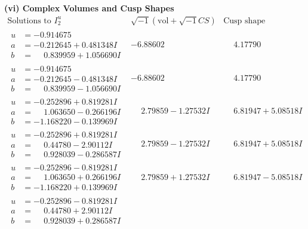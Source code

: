 \documentclass[1p]{elsarticle_modified}
\theoremstyle{definition}
\newcommand{\I}{\sqrt{-1}}
\begin{document}
\newpage\flushleft \textbf{(vi) Complex Volumes and Cusp Shapes}
$$\begin{array}{c|c|c}  
\text{Solutions to }I^u_{2}& \I (\text{vol} + \sqrt{-1}CS) & \text{Cusp shape}\\
 \hline 
\begin{aligned}
u &= -0.914675\phantom{ +0.000000I} \\
a &= -0.212645 + 0.481348 I \\
b &= \phantom{-}0.839959 + 1.056690 I\end{aligned}
 & -6.88602\phantom{ +0.000000I} & \phantom{-}4.17790\phantom{ +0.000000I} \\ \hline\begin{aligned}
u &= -0.914675\phantom{ +0.000000I} \\
a &= -0.212645 - 0.481348 I \\
b &= \phantom{-}0.839959 - 1.056690 I\end{aligned}
 & -6.88602\phantom{ +0.000000I} & \phantom{-}4.17790\phantom{ +0.000000I} \\ \hline\begin{aligned}
u &= -0.252896 + 0.819281 I \\
a &= \phantom{-}1.063650 - 0.266196 I \\
b &= -1.168220 - 0.139969 I\end{aligned}
 & \phantom{-}2.79859 - 1.27532 I & \phantom{-}6.81947 + 5.08518 I \\ \hline\begin{aligned}
u &= -0.252896 + 0.819281 I \\
a &= \phantom{-}0.44780 - 2.90112 I \\
b &= \phantom{-}0.928039 - 0.286587 I\end{aligned}
 & \phantom{-}2.79859 - 1.27532 I & \phantom{-}6.81947 + 5.08518 I \\ \hline\begin{aligned}
u &= -0.252896 - 0.819281 I \\
a &= \phantom{-}1.063650 + 0.266196 I \\
b &= -1.168220 + 0.139969 I\end{aligned}
 & \phantom{-}2.79859 + 1.27532 I & \phantom{-}6.81947 - 5.08518 I \\ \hline\begin{aligned}
u &= -0.252896 - 0.819281 I \\
a &= \phantom{-}0.44780 + 2.90112 I \\
b &= \phantom{-}0.928039 + 0.286587 I\end{aligned}

\end{array}$$
\end{document}
